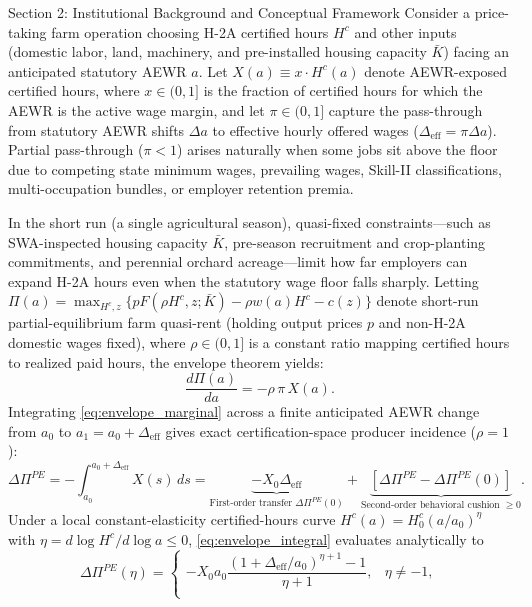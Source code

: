 \begin{llmdraft}{Section 2: Institutional Background and Conceptual Framework}
Consider a price-taking farm operation choosing H-2A certified hours $H^c$ and
other inputs (domestic labor, land, machinery, and pre-installed housing
capacity $\bar{K}$) facing an anticipated statutory AEWR $a$. Let $X(a) \equiv
x \cdot H^c(a)$ denote AEWR-exposed certified hours, where $x \in (0, 1]$ is
the fraction of certified hours for which the AEWR is the active wage margin,
and let $\pi \in (0, 1]$ capture the pass-through from statutory AEWR shifts
$\Delta a$ to effective hourly offered wages ($\Delta_{\text{eff}} = \pi \Delta
a$). Partial pass-through ($\pi < 1$) arises naturally when some jobs sit above
the floor due to competing state minimum wages, prevailing wages, Skill-II
classifications, multi-occupation bundles, or employer retention premia.

In the short run (a single agricultural season), quasi-fixed constraints---such
as SWA-inspected housing capacity $\bar{K}$, pre-season recruitment and
crop-planting commitments, and perennial orchard acreage---limit how far
employers can expand H-2A hours even when the statutory wage floor falls
sharply. Letting $\Pi(a) = \max_{H^c, z} \{p F(\rho H^c, z; \bar{K}) - \rho
w(a) H^c - c(z)\}$ denote short-run partial-equilibrium farm quasi-rent
(holding output prices $p$ and non-H-2A domestic wages fixed), where $\rho \in
(0, 1]$ is a constant ratio mapping certified hours to realized paid hours, the
envelope theorem yields:
\begin{equation}
  \frac{d \Pi(a)}{da} = -\rho \, \pi \, X(a).
  \label{eq:envelope_marginal}
\end{equation}
Integrating \eqref{eq:envelope_marginal} across a finite anticipated AEWR
change from $a_0$ to $a_1 = a_0 + \Delta_{\text{eff}}$ gives exact
certification-space producer incidence ($\rho = 1$):
\begin{equation}
  \Delta \Pi^{PE} = -\int_{a_0}^{a_0 + \Delta_{\text{eff}}} X(s)\,ds
  = \underbrace{-X_0 \Delta_{\text{eff}}}_{\text{First-order transfer }\Delta\Pi^{PE}(0)}
  + \underbrace{\left[\Delta\Pi^{PE} - \Delta\Pi^{PE}(0)\right]}_{\text{Second-order behavioral cushion } \ge 0}.
  \label{eq:envelope_integral}
\end{equation}
Under a local constant-elasticity certified-hours curve
$H^c(a) = H^c_0 (a/a_0)^\eta$ with $\eta = d\log H^c / d\log a \le 0$,
\eqref{eq:envelope_integral} evaluates analytically to
\begin{equation}
  \Delta \Pi^{PE}(\eta) =
  \begin{cases}
    -X_0 a_0 \dfrac{(1 + \Delta_{\text{eff}}/a_0)^{\eta + 1} - 1}{\eta + 1}, & \eta \neq -1, \\[8pt]

\end{cases}
\end{equation}
\end{llmdraft}
